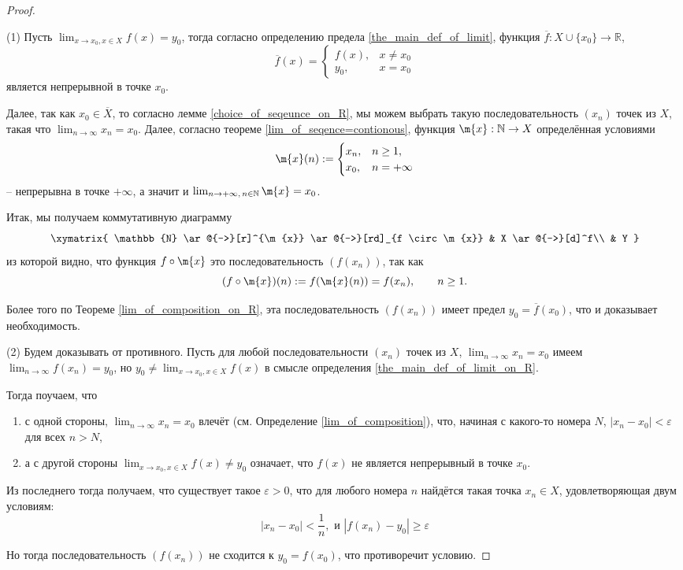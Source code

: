 \begin{proof}~

(1) Пусть $\lim_{x \to x_0, x \in X}f(x) = y_0$, тогда согласно определению предела \ref{the_main_def_of_limit}, функция $\overline{f}: X \cup \{x_0\} \to \mathbb{R}$,
\[
 \overline{f}(x) = \begin{cases}
     f(x), & x \ne x_0 \\
     y_0, & x = x_0
 \end{cases}
\]
является непрерывной в точке $x_0$.

Далее, так как $x_0 \in \overline{X}$, то согласно лемме \ref{choice_of_seqeunce_on_R}, мы можем выбрать такую последовательность $(x_n)$ точек из $X$, такая что $\lim_{n \to \infty }x_n = x_0$. Далее, согласно теореме \ref{lim_of_seqence=contionous}, функция $\m{x}: \mathbb{N} \to X$ определённая условиями
\[
 \m{x}(n): = \begin{cases}
     x_n, & n \ge 1,\\
     x_0, & n = +\infty
 \end{cases}
\]
-- непрерывна в точке $+\infty$, а значит и $\lim_{n \to +\infty,\, n \in \mathbb{N}}\m{x} = x_0$.

Итак, мы получаем коммутативную диаграмму
\[
 \xymatrix{
 \mathbb{N} \ar@{->}[r]^{\m{x}} \ar@{->}[rd]_{f \circ \m{x}} & X \ar@{->}[d]^f\\
 & Y
 }
\]
из которой видно, что функция $f\circ \m{x}$ это последовательность $(f(x_n))$, так как
\[
 (f\circ \m{x})(n):= f(\m{x}(n)) = f(x_n), \qquad n \ge 1.
\]

Более того по Теореме \ref{lim_of_composition_on_R}, эта последовательность $(f(x_n))$ имеет предел $y_0 = \overline{f}(x_0)$, что и доказывает необходимость.

(2) Будем доказывать от противного. Пусть для любой последовательности $(x_n)$ точек из $X$, $\lim_{n \to \infty} x_n = x_0$ имеем $\lim_{n \to \infty}f(x_n) = y_0$, но $y_0 \ne \lim_{x \to x_0, x\in X}f(x)$ в смысле определения \ref{the_main_def_of_limit_on_R}.

Тогда поучаем, что
\begin{enumerate}
    \item[] с одной стороны, $\lim_{n \to \infty} x_n = x_0$ влечёт (см. Определение \ref{lim_of_composition}), что, начиная с какого-то номера $N$, $|x_n - x_0| < \varepsilon$ для всех $n > N$,
    \item[] а с другой стороны $\lim_{x \to x_0, x\in X}f(x) \ne y_0$ означает, что $f(x)$ не является непрерывный в точке $x_0$.
\end{enumerate}

Из последнего тогда получаем, что существует такое $\varepsilon >0$, что для любого номера $n$ найдётся такая точка $x_n \in X$, удовлетворяющая двум условиям:
\[
  |x_n - x_0| < \frac{1}{n}, \mbox{ и } |f(x_n) - y_0| \ge \varepsilon
\]

Но тогда последовательность $(f(x_n))$ не сходится к $y_0 = f(x_0)$, что противоречит условию.
\end{proof}

